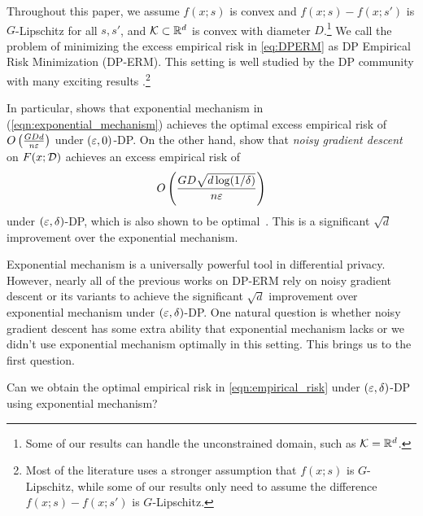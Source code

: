  Throughout this paper, we assume $f(x;s)$ is convex and $f(x;s)-f(x;s')$ is $G$-Lipschitz for all $s,s'$, and $\mathcal K\subset \mathbb{R}^d$ is convex with diameter $D$.\footnote{Some of our results can handle the unconstrained domain, such as $\mathcal K=\mathbb{R}^d$.} We call the problem of minimizing the excess empirical risk in \eqref{eq:DPERM} as DP Empirical Risk Minimization (DP-ERM). This setting is well studied by the DP community with many exciting results \cite{CM08,rbht09,cms11,jt14,BST14,kj16,fts17,zzmw17,Wang18,ins+19,bftt19,FKT20,KLL21,bgn21,LL21,AFKT21,sstt21,MBST21,GTU22}.\footnote{Most of the literature uses a stronger assumption that $f(x;s)$ is $G$-Lipschitz, while some of our results only need to assume the difference $f(x;s)-f(x;s')$ is $G$-Lipschitz.}
 
In particular, \cite{BST14} shows that exponential mechanism in (\ref{eqn:exponential_mechanism}) achieves the optimal excess empirical risk of $O\left( \frac{GDd}{n\varepsilon}\right)$ under $(\varepsilon,0)$-DP. On the other hand, \cite{BST14,bftt19,bfgt20} show that \emph{noisy gradient descent} on $F(x;\mathcal D)$ achieves an excess empirical risk of 
\begin{equation}
\label{eqn:optimal_empirical_risk}
O\left( \frac{GD\sqrt{d \log(1/\delta)}}{n\varepsilon}\right)    
\end{equation}
under $(\varepsilon,\delta)$-DP, which is also shown to be optimal~\cite{BST14}. This is a significant $\sqrt{d}$ improvement over the exponential mechanism. 

Exponential mechanism is a universally powerful tool in differential privacy.
However, nearly all of the previous works on DP-ERM rely on noisy gradient descent or its variants to achieve the significant $\sqrt{d}$ improvement over exponential mechanism under $(\varepsilon,\delta)$-DP. 
One natural question is whether noisy gradient descent has some extra ability that exponential mechanism lacks or we didn't use exponential mechanism optimally in this setting. This brings us to the first question.
\begin{question}
Can we obtain the optimal empirical risk in \eqref{eqn:empirical_risk} under $(\varepsilon,\delta)$-DP using exponential mechanism?
\end{question}

